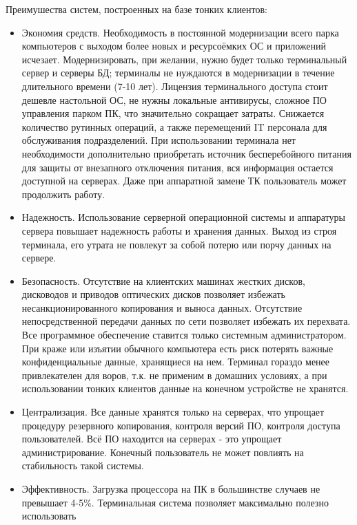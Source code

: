Преимушества систем, построенных на базе тонких клиентов:
\begin{itemize}
    \item   Экономия средств. Необходимость в постоянной модернизации всего парка
        компьютеров с выходом более новых и ресурсоёмких ОС и приложений исчезает.
        Модернизировать, при желании, нужно будет только терминальный сервер и серверы
        БД; терминалы не нуждаются в модернизации в течение длительного времени (7-10
        лет). Лицензия терминального доступа стоит дешевле настольной ОС, не нужны
        локальные антивирусы, сложное ПО управления парком ПК, что значительно сокращает
        затраты. Снижается количество рутинных операций, а также перемещений IT
        персонала для обслуживания подразделений. При использовании терминала нет
        необходимости дополнительно приобретать источник бесперебойного питания для
        защиты от внезапного отключения питания, вся информация остается доступной на
        серверах. Даже при аппаратной замене ТК пользователь может продолжить работу.
    \item   Надежность. Использование серверной операционной системы и аппаратуры
        сервера повышает надежность работы и хранения данных. Выход из строя терминала,
        его утрата не повлекут за собой потерю или порчу данных на сервере.
    \item   Безопасность. Отсутствие на клиентских машинах жестких дисков, дисководов и
        приводов оптических дисков позволяет избежать несанкционированного копирования и
        выноса данных. Отсутствие непосредственной передачи данных по сети позволяет
        избежать их перехвата. Все программное обеспечение ставится только системным
        администратором. При краже или изъятии обычного компьютера есть риск потерять
        важные конфиденциальные данные, хранящиеся на нем. Терминал гораздо менее
        привлекателен для воров, т.к. не применим в домашних условиях, а при
        использовании тонких клиентов данные на конечном устройстве не хранятся.
    \item   Централизация. Все данные хранятся только на серверах, что упрощает
        процедуру резервного копирования, контроля версий ПО, контроля доступа
        пользователей. Всё ПО находится на серверах - это упрощает администрирование.
        Конечный пользователь не может повлиять на стабильность такой системы.
    \item   Эффективность. Загрузка процессора на ПК в большинстве случаев не превышает
        4-5\%. Терминальная система позволяет максимально полезно использовать

\end{itemize}
